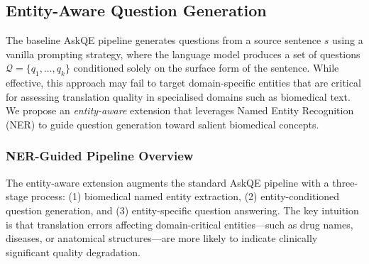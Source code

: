 

\subsection{Entity-Aware Question Generation}
\label{sec:ner_methodology}

The baseline AskQE pipeline generates questions from a source sentence $s$ using a vanilla prompting strategy, where the language model produces a set of questions $\mathcal{Q} = \{q_1, \ldots, q_k\}$ conditioned solely on the surface form of the sentence. While effective, this approach may fail to target domain-specific entities that are critical for assessing translation quality in specialised domains such as biomedical text. We propose an \textit{entity-aware} extension that leverages Named Entity Recognition (NER) to guide question generation toward salient biomedical concepts.

\subsubsection{NER-Guided Pipeline Overview}

The entity-aware extension augments the standard AskQE pipeline with a three-stage process: (1) biomedical named entity extraction, (2) entity-conditioned question generation, and (3) entity-specific question answering. The key intuition is that translation errors affecting domain-critical entities---such as drug names, diseases, or anatomical structures---are more likely to indicate clinically significant quality degradation.

